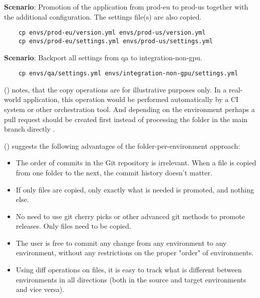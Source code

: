 \noindent
\textbf{Scenario}: Promotion of the application from prod-eu to prod-us together with the additional configuration. The settings file(s) are also copied.

\begin{verbatim}
	cp envs/prod-eu/version.yml envs/prod-us/version.yml
	cp envs/prod-eu/settings.yml envs/prod-us/settings.yml
\end{verbatim}

\noindent
\textbf{Scenario}: Backport all settings from qa to integration-non-gpu.

\begin{verbatim}
	cp envs/qa/settings.yml envs/integration-non-gpu/settings.yml
\end{verbatim}

\noindent
\citeauthor{codefreshHowToModelGitOpsEnvironmentsAndPromote} (\citeyear{codefreshHowToModelGitOpsEnvironmentsAndPromote})
notes,
that the copy operations are for illustrative purposes only. 
In a real-world application, this operation would be performed automatically by a CI system 
or other orchestration tool. And depending on the environment 
perhaps a pull request should be created first instead of processing the folder in the main branch directly
\autocite{codefreshHowToModelGitOpsEnvironmentsAndPromote}.
\bigskip

\noindent
\citeauthor{codefreshHowToModelGitOpsEnvironmentsAndPromote} (\citeyear{codefreshHowToModelGitOpsEnvironmentsAndPromote})
suggests the following advantages of the folder-per-environment approach:

\begin{itemize}
	\item The order of commits in the Git repository is irrelevant. When a file is copied from one folder to the next, the commit history doesn't matter.
	\item If only files are copied, only exactly what is needed is promoted, and nothing else.
	\item No need to use git cherry picks or other advanced git methods to promote releases. Only files need to be copied.
	\item The user is free to commit any change from any environment to any environment, without any restrictions on the proper "order" of environments.
	\item Using diff operations on files, it is easy to track what is different between environments in all directions (both in the source and target environments and vice versa).
\end{itemize}

\noindent
\autocite{codefreshHowToModelGitOpsEnvironmentsAndPromote}









